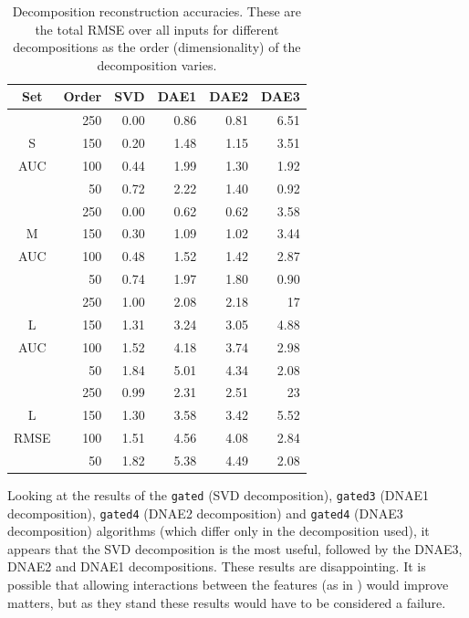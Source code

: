 \documentclass{article}
\begin{document}
\begin{table}[t]
\caption{Decomposition reconstruction accuracies.  These are the total RMSE over all inputs for different decompositions as the order (dimensionality) of the decomposition varies.}
\label{table:dnae-decomposition-accuracy}
\vskip 0.15in
\begin{center}
\begin{small}
\begin{sc}
\begin{tabular}{crrrrr}
\hline
\abovespace\belowspace
Set & Order & SVD & DAE1 & DAE2 & DAE3 \\
\hline
\abovespace
     & 250 & 0.00 & 0.86 & 0.81 & 6.51 \\
S    & 150 & 0.20 & 1.48 & 1.15 & 3.51 \\
AUC  & 100 & 0.44 & 1.99 & 1.30 & 1.92 \\
     &  50 & 0.72 & 2.22 & 1.40 & 0.92 \\
\abovespace
     & 250 & 0.00 & 0.62 & 0.62 & 3.58 \\
M    & 150 & 0.30 & 1.09 & 1.02 & 3.44 \\
AUC  & 100 & 0.48 & 1.52 & 1.42 & 2.87 \\
     &  50 & 0.74 & 1.97 & 1.80 & 0.90 \\
\abovespace
     & 250 & 1.00 & 2.08 & 2.18 & 17 \\
L    & 150 & 1.31 & 3.24 & 3.05 & 4.88 \\
AUC  & 100 & 1.52 & 4.18 & 3.74 & 2.98 \\
     &  50 & 1.84 & 5.01 & 4.34 & 2.08 \\
\abovespace
     & 250 & 0.99 & 2.31 & 2.51 & 23 \\
L    & 150 & 1.30 & 3.58 & 3.42 & 5.52 \\
RMSE & 100 & 1.51 & 4.56 & 4.08 & 2.84 \\
\belowspace
     &  50 & 1.82 & 5.38 & 4.49 & 2.08 \\
\hline
\end{tabular}
\end{sc}
\end{small}
\end{center}
\vskip -0.1in
\end{table}

Looking at the results of the \texttt{gated} (SVD decomposition), \texttt{gated3} (DNAE1 decomposition), \texttt{gated4} (DNAE2 decomposition) and \texttt{gated4} (DNAE3 decomposition) algorithms (which differ only in the decomposition used), it appears that the SVD decomposition is the most useful, followed by the DNAE3, DNAE2 and DNAE1 decompositions.  These results are disappointing.  It is possible that allowing interactions between the features (as in \cite{larochelle2009}) would improve matters, but as they stand these results would have to be considered a failure.
\end{document}
